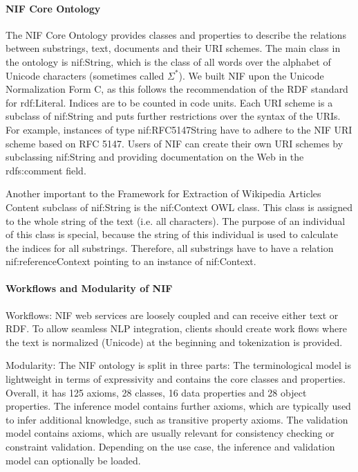 \documentclass[thesis=M,english,hidelinks]{FITthesis}[2019/12/23]
\begin{document}
\paragraph{NIF Core Ontology}



The NIF Core Ontology\cite{nif_core_ontology} provides classes and properties to describe the relations between substrings, text, documents and their URI schemes. The main class in the ontology is nif:String, which is the class of all words over the alphabet of Unicode characters (sometimes called $\Sigma^{*}$). We built NIF upon the Unicode Normalization Form C, as this follows the recommendation of the RDF standard for rdf:Literal. Indices are to be counted in code units. Each URI scheme is a subclass of nif:String and puts further restrictions over the syntax of the URIs. For example, instances of type nif:RFC5147String have to adhere to the NIF URI scheme based on RFC 5147. Users of NIF can create their own URI schemes by subclassing nif:String and providing documentation on the Web in the rdfs:comment field.

Another important to the Framework for Extraction of Wikipedia Articles Content subclass of nif:String is the nif:Context OWL class. This class is assigned to the whole string of the text (i.e. all characters). The purpose of an individual of this class is special, because the string of this individual is used to calculate the indices for all substrings. Therefore, all substrings have to have a relation nif:referenceContext pointing to an instance of nif:Context.



\paragraph{Workflows and Modularity of NIF}

Workflows: NIF web services are loosely coupled and can receive either text or RDF. To allow seamless NLP integration, clients should create work flows where the text is normalized (Unicode) at the beginning and tokenization is provided.\cite{workflow_modularity}

Modularity: The NIF ontology is split in three parts: The terminological model is lightweight in terms of expressivity and contains the core classes
and properties. Overall, it has 125 axioms, 28 classes, 16 data properties and 28 object properties. The inference model contains further axioms, which are typically used to infer additional knowledge, such as transitive property axioms. The validation model contains axioms, which are usually relevant for consistency checking or constraint validation. Depending on the use case, the inference and validation model can
optionally be loaded. 
\end{document}
